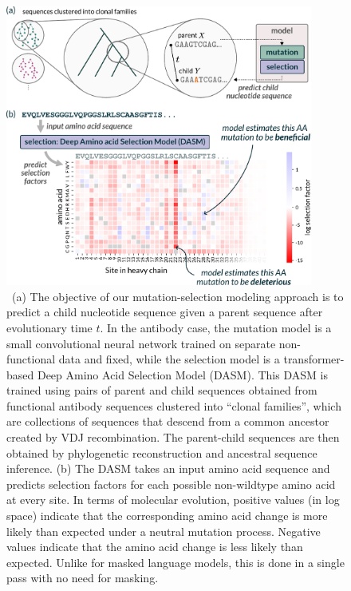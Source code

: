 \documentclass{article}
\begin{document}
\begin{figure}[h!]
\centering
\centerline{\includegraphics[width=0.9\textwidth]{figures/dasm-output-schematic}}
\caption{\
(a) The objective of our mutation-selection modeling approach is to predict a child nucleotide sequence given a parent sequence after evolutionary time $t$. 
In the antibody case, the mutation model is a small convolutional neural network trained on separate non-functional data and fixed, while the selection model is a transformer-based Deep Amino Acid Selection Model (DASM). 
This DASM is trained using pairs of parent and child sequences obtained from functional antibody sequences clustered into ``clonal families'', which are collections of sequences that descend from a common ancestor created by VDJ recombination.
The parent-child sequences are then obtained by phylogenetic reconstruction and ancestral sequence inference.
(b) The DASM takes an input amino acid sequence and predicts selection factors for each possible non-wildtype amino acid at every site. 
In terms of molecular evolution, positive values (in log space) indicate that the corresponding amino acid change is more likely than expected under a neutral mutation process. 
Negative values indicate that the amino acid change is less likely than expected. 
Unlike for masked language models, this is done in a single pass with no need for masking.
}%
\label{fig:methods}
\end{figure}
\end{document}

